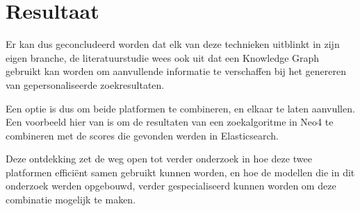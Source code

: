 \section{Resultaat}
\label{sec:Resultaat}

Er kan dus geconcludeerd worden dat elk van deze technieken uitblinkt in zijn eigen branche, de literatuurstudie wees ook uit dat een Knowledge Graph gebruikt kan worden om aanvullende informatie te verschaffen bij het genereren van gepersonaliseerde zoekresultaten. 

Een optie is dus om beide platformen te combineren, en elkaar te laten aanvullen. Een voorbeeld hier van is om de resultaten van een zoekalgoritme in Neo4 te combineren met de scores die gevonden werden in Elasticsearch. 

Deze ontdekking zet de weg open tot verder onderzoek in hoe deze twee platformen efficiënt samen gebruikt kunnen worden, en hoe de modellen die in dit onderzoek werden opgebouwd, verder gespecialiseerd kunnen worden om deze combinatie mogelijk te maken. 
